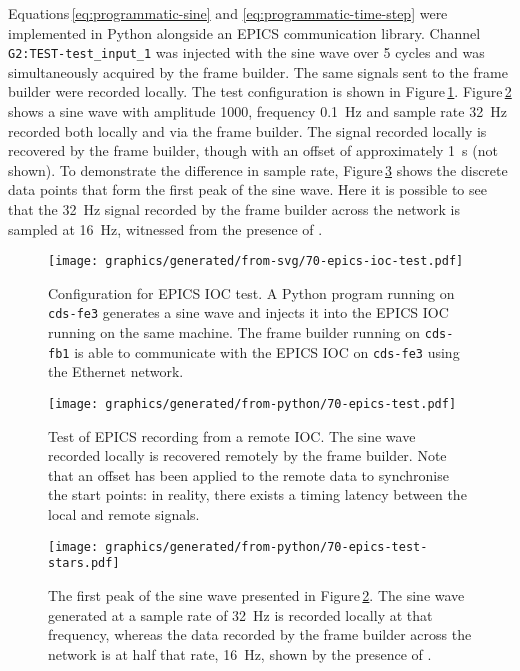 Equations\,\ref{eq:programmatic-sine} and \ref{eq:programmatic-time-step} were implemented in Python alongside an \gls{EPICS} communication library. Channel \lstinline!G2:TEST-test_input_1! was injected with the sine wave over \num{5} cycles and was simultaneously acquired by the frame builder. The same signals sent to the frame builder were recorded locally. The test configuration is shown in Figure\,\ref{fig:epics-ioc-test}. Figure\,\ref{fig:epics-test} shows a sine wave with amplitude \num{1000}, frequency \SI{0.1}{\hertz} and sample rate \SI{32}{\hertz} recorded both locally and via the frame builder. The signal recorded locally is recovered by the frame builder, though with an offset of approximately \SI{1}{\second} (not shown). To demonstrate the difference in sample rate, Figure\,\ref{fig:epics-test-stars} shows the discrete data points that form the first peak of the sine wave. Here it is possible to see that the \SI{32}{\hertz} signal recorded by the frame builder across the network is sampled at \SI{16}{\hertz}, witnessed from the presence of .

\begin{figure}
  \centering
  \texttt{[image: graphics/generated/from-svg/70-epics-ioc-test.pdf]}
  \caption[Configuration for input/output controller test]{\label{fig:epics-ioc-test}Configuration for EPICS IOC test. A Python program running on \lstinline!cds-fe3! generates a sine wave and injects it into the EPICS IOC running on the same machine. The frame builder running on \lstinline!cds-fb1! is able to communicate with the EPICS IOC on \lstinline!cds-fe3! using the Ethernet network.}
\end{figure}

\begin{figure}
  \centering
  \texttt{[image: graphics/generated/from-python/70-epics-test.pdf]}
  \caption[Recording a remote input/output controller with the frame builder]{\label{fig:epics-test}Test of EPICS recording from a remote IOC. The sine wave recorded locally is recovered remotely by the frame builder. Note that an offset has been applied to the remote data to synchronise the start points: in reality, there exists a timing latency between the local and remote signals.}
\end{figure}

\begin{figure}
  \centering
  \texttt{[image: graphics/generated/from-python/70-epics-test-stars.pdf]}
  \caption[Effects of the sample rate on signal reconstruction from the input/output controller]{\label{fig:epics-test-stars}The first peak of the sine wave presented in Figure\,\ref{fig:epics-test}. The sine wave generated at a sample rate of \SI{32}{\hertz} is recorded locally at that frequency, whereas the data recorded by the frame builder across the network is at half that rate, \SI{16}{\hertz}, shown by the presence of .}
\end{figure}

